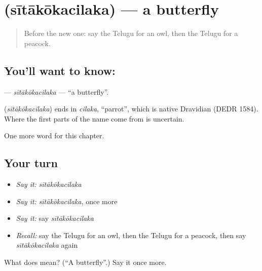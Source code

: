 \section[\texorpdfstring{\te{సీతాకోకచిలుక} (sītākōkacilaka)}{సీతాకోకచిలుక (sītākōkacilaka)}]{ (sītākōkacilaka) — a butterfly}

\label{lesson:TE-C125-sitakokacilaka}



\begin{quote}
Before the new one: say the Telugu for an owl, then the Telugu for a peacock.
\end{quote}

\subsection*{You'll want to know: }
\textbf{} — \emph{sītākōkacilaka} — \textquotedblleft{}a butterfly\textquotedblright{}.

\begin{cousinweb}
\textbf{} (\emph{sītākōkacilaka}) ends in \emph{cilaka}, \textquotedblleft{}parrot\textquotedblright{}, which is native Dravidian (DEDR 1584). Where the first parts of the name come from is uncertain.
\end{cousinweb}

\begin{grammarlens}[title={What you've built}]
One more word for this chapter.
\end{grammarlens}

\subsection*{Your turn}
\begin{itemize}
\raggedright
  \item \emph{Say it:} \emph{sītākōkacilaka}
  \item \emph{Say it:} \emph{sītākōkacilaka}, once more
  \item \emph{Say it:} say \emph{sītākōkacilaka}
  \item \emph{Recall:} say the Telugu for an owl, then the Telugu for a peacock, then say \emph{sītākōkacilaka} again
\end{itemize}

\begin{tcolorbox}[breakable,colback=teal!4,colframe=teal!35!black,title={Before you move on}]
What does  mean? (\textquotedblleft{}A butterfly\textquotedblright{}.) Say it once more.
\end{tcolorbox}
